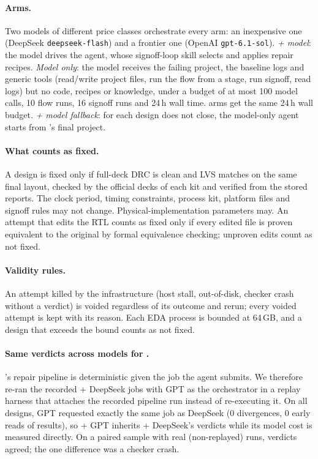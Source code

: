 \paragraph{Arms.}
Two models of different price classes orchestrate every arm: an inexpensive one (DeepSeek
\texttt{deepseek-flash}) and a frontier one (OpenAI \texttt{gpt-6.1-sol}).
\emph{\R + model}: the model drives the \R agent, whose signoff-loop skill selects and applies repair
recipes. \emph{Model only}: the model receives the failing project, the baseline logs and generic
tools (read/write project files, run the flow from a stage, run signoff, read logs) but no \R code,
recipes or knowledge, under a budget of at most 100 model calls, 10 flow runs, 16 signoff runs and
24\,h wall time. \R arms get the same 24\,h wall budget. \emph{\R + model fallback}: for each design \R
does not close, the model-only agent starts from \R's final project.

\paragraph{What counts as fixed.}
A design is fixed only if full-deck DRC is clean and LVS matches on the same final layout, checked by
the official decks of each kit and verified from the stored reports. The clock period, timing
constraints, process kit, platform files and signoff rules may not change. Physical-implementation
parameters may. An attempt that edits the RTL counts as fixed only if every edited file is proven
equivalent to the original by formal equivalence checking; unproven edits count as not fixed.

\paragraph{Validity rules.}
An attempt killed by the infrastructure (host stall, out-of-disk, checker crash without a verdict)
is voided regardless of its outcome and rerun; every voided attempt is kept with its reason. Each
EDA process is bounded at 64\,GB, and a design that exceeds the bound counts as not fixed.

\paragraph{Same verdicts across models for \R.}
\R's repair pipeline is deterministic given the job the agent submits. We therefore re-ran the
recorded \R + DeepSeek jobs with GPT as the orchestrator in a replay harness that attaches the
recorded pipeline run instead of re-executing it. On all designs, GPT requested exactly the same job
as DeepSeek (0 divergences, 0 early reads of results), so \R + GPT inherits \R + DeepSeek's verdicts
while its model cost is measured directly. On a paired sample with real (non-replayed) runs,
 verdicts agreed; the one difference was a checker crash.


